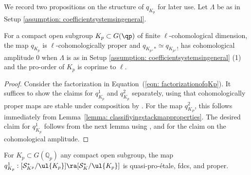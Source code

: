 \documentclass[letterpaper,11pt]{amsart}
\begin{document}
We record two propositions on the structure of $q_{K_{p}}$ for later use. Let $\Lambda$ be as in Setup \ref{assumption: coefficientsystemsingeneral}.
\begin{proposition}\label{prop: qKpProper}
For a compact open subgroup $K_p\subset G(\qp)$ of finite $\ell$-cohomological dimension, the map $q_{K_p}$ is $\ell$-cohomologically proper and $q_{K_p,\ast} \simeq q_{K_p,!}$ has cohomological amplitude $0$ when $\Lambda$ is as in Setup \ref{assumption: coefficientsystemsingeneral} (1) and the pro-order of $K_p$ is coprime to $\ell$.
\end{proposition}
\begin{proof}
Consider the factorization in Equation~(\ref{eqn: factorizationofqKp}). It suffices to show the claims for $q^{1}_{K_{p}}$ and $q^2_{K_{p}}$ separately, using that cohomologically proper maps are stable under composition by \cite[Lemma~9.8 (ii)]{Mann2022NuclearSheaves}. For the map $q^2_{K_P}$, this follows immediately from Lemma~\ref{lemma: classifiyingstackmapproperties}. The desired claim for $q^1_{K_p}$ follows from the next lemma using \cite[Lemma~9.8 (i)]{Mann2022NuclearSheaves}, and \cite[Remark~21.14]{Ecod} for the claim on the cohomological amplitude. 
\end{proof}

\begin{lemma}{\label{lemma: q1isquasiproetaleandproper}}
For $K_{p} \subset G(\mathbb{Q}_{p})$ any compact open subgroup, the map $q^1_{K_p}: [\mathcal{S}_{K^p}^{*}/\ul{K_p}] \ra [\mathcal{S}^{*}_{K}/\ul{K_p}]$ is quasi-pro-\'etale, fdcs, and proper.
\end{lemma}
\end{document}
